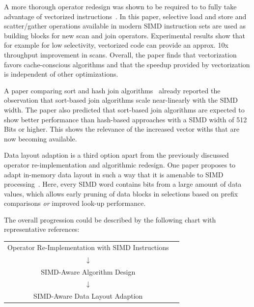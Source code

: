 \documentclass[sigconf]{acmart}
\begin{document}
A more thorough operator redesign was shown to be required to to fully take advantage of vectorized instructions~\cite{Polychroniou:2015:RSV:2723372.2747645}. In this paper, selective load and store and scatter/gather operations available in modern SIMD instruction sets are used as building blocks for new scan and join operators. Experimental results show that for example for low selectivity, vectorized code can provide an approx. 10x throughput improvement in scans. Overall, the paper finds that vectorization favors cache-conscious algorithms and that the speedup provided by vectorization is independent of other optimizations.

A paper comparing sort and hash join algorithms~\cite{DBLP:journals/pvldb/KimSCKNBLSD09} already reported the observation that sort-based join algorithms scale near-linearly with the SIMD width. The paper also predicted that sort-based join algorithms are expected to show better performance than hash-based approaches with a SIMD width of 512 Bits or higher. This shows the relevance of the increased vector withs that are now becoming available.

Data layout adaption is a third option apart from the previously discussed operator re-implementation and algorithmic redesign. One paper proposes to adapt in-memory data layout in such a way that it is amenable to SIMD processing~\cite{Li:2013:BFS:2463676.2465322}. Here, every SIMD word contains bits from a large amount of data values, which allows early pruning of data blocks in selections based on prefix comparisons \emph{or} improved look-up performance.

The overall progression could be described by the following chart with representative references:

\bigskip

\begin{center}
\begin{tabular}{cr}
Operator Re-Implementation with SIMD Instructions & \cite{DBLP:conf/sigmod/ZhouR02} \\
$\downarrow$ & \\
SIMD-Aware Algorithm Design & \cite{Polychroniou:2015:RSV:2723372.2747645} \\
$\downarrow$ & \\
SIMD-Aware Data Layout Adaption & \cite{Li:2013:BFS:2463676.2465322}\\
\end{tabular}
\end{center}

\bigskip
\end{document}

